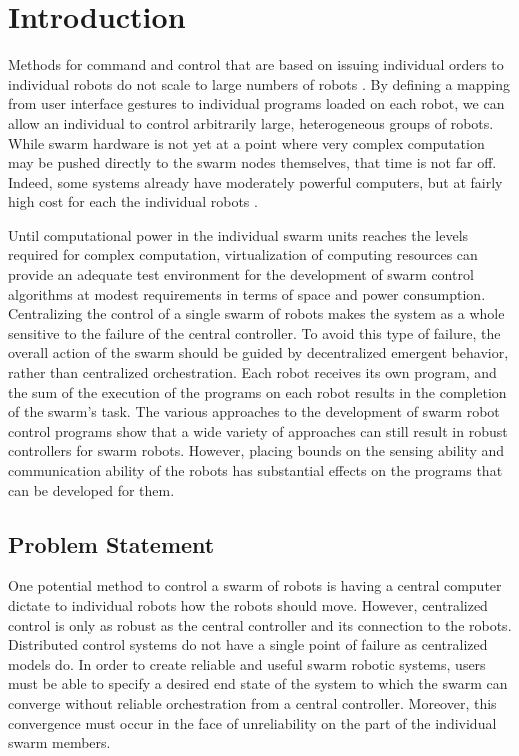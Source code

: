 \chapter{Introduction}
\thispagestyle{fancy}

Methods for command and control that are based on issuing individual orders to individual robots do not scale to large numbers of robots \citep{WangSearchScale}.
By defining a mapping from user interface gestures to individual programs loaded on each robot, we can allow an individual to control arbitrarily large, heterogeneous groups of robots.
While swarm hardware is not yet at a point where very complex computation may be pushed directly to the swarm nodes themselves, that time is not far off. 
Indeed, some systems already have moderately powerful computers, but at fairly high cost for each the individual robots \citep{millard2017pi}.

Until computational power in the individual swarm units reaches the levels required for complex computation, virtualization of computing resources can provide an adequate test environment for the development of swarm control algorithms at modest requirements in terms of space and power consumption. 
Centralizing the control of a single swarm of robots makes the system as a whole sensitive to the failure of the central controller. 
To avoid this type of failure, the overall action of the swarm should be guided by decentralized emergent behavior, rather than centralized orchestration. 
Each robot receives its own program, and the sum of the execution of the programs on each robot results in the completion of the swarm's task.
The various approaches to the development of swarm robot control programs show that a wide variety of approaches can still result in robust controllers for swarm robots. 
However, placing bounds on the sensing ability and communication ability of the robots has substantial effects on the programs that can be developed for them. 

\section{Problem Statement} \label{section:Problem_Statement}

One potential method to control a swarm of robots is having a central computer dictate to individual robots how the robots should move.
However, centralized control is only as robust as the central controller and its connection to the robots. 
Distributed control systems do not have a single point of failure as centralized models do. 
In order to create reliable and useful swarm robotic systems, users must be able to specify a desired end state of the system to which the swarm can converge without reliable orchestration from a central controller. 
Moreover, this convergence must occur in the face of unreliability on the part of the individual swarm members. 


